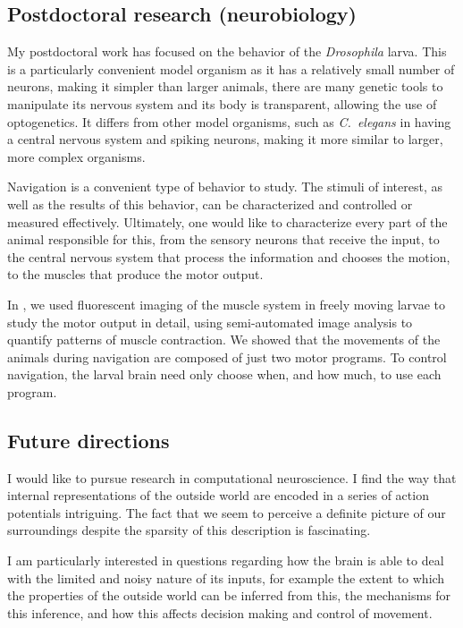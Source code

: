 \documentclass[11pt]{article}
\begin{document}
\subsection*{Postdoctoral research (neurobiology)}

My postdoctoral work has focused on the behavior of the \emph{Drosophila} larva. This is a particularly convenient model organism as it has a relatively small number of neurons, making it simpler than larger animals, there are many genetic tools to manipulate its nervous system and its body is transparent, allowing the use of optogenetics. It differs from other model organisms, such as \emph{C.\ elegans} in having a central nervous system and spiking neurons, making it more similar to larger, more complex organisms.

Navigation is a convenient type of behavior to study. The stimuli of interest, as well as the results of this behavior, can be characterized and controlled or measured effectively. Ultimately, one would like to characterize every part of the animal responsible for this, from the sensory neurons that receive the input, to the central nervous system that process the information and chooses the motion, to the muscles that produce the motor output.

In \cite{Lahiri2011}, we used fluorescent imaging of the muscle system in freely moving larvae to study the motor output in detail, using semi-automated image analysis to quantify patterns of muscle contraction. We showed that the movements of the animals during navigation are composed of just two motor programs. To control navigation, the larval brain need only choose when, and how much, to use each program.

\subsection*{Future directions}

I would like to pursue research in computational neuroscience. I find the way that internal representations of the outside world are encoded in a series of action potentials intriguing. The fact that we seem to perceive a definite picture of our surroundings despite the sparsity of this description is fascinating.

I am particularly interested in questions regarding how the brain is able to deal with the limited and noisy nature of its inputs, for example the extent to which the properties of the outside world can be inferred from this, the mechanisms for this inference, and how this affects decision making and control of movement.
\end{document}

